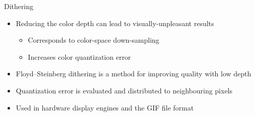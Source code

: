 \begin{frame}{Dithering}
  \begin{itemize}
  \item Reducing the color depth can lead to visually-unpleasant results
    \begin{itemize}
    \item Corresponds to color-space down-sampling
    \item Increases color quantization error
    \end{itemize}
  \item Floyd–Steinberg dithering is a method for improving quality with low depth
  \item Quantization error is evaluated and distributed to neighbouring pixels
  \item Used in hardware display engines and the GIF file format
  \end{itemize}~\\


\end{frame}
